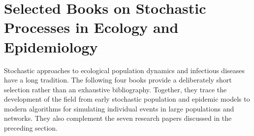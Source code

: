 \section{Selected Books on Stochastic Processes in Ecology and Epidemiology}
\label{sec:selected_stochastic_books}

Stochastic approaches to ecological population dynamics and infectious diseases have a long tradition. The following four books provide a deliberately short selection rather than an exhaustive bibliography. Together, they trace the development of the field from early stochastic population and epidemic models to modern algorithms for simulating individual events in large populations and networks. They also complement the seven research papers discussed in the preceding section.

